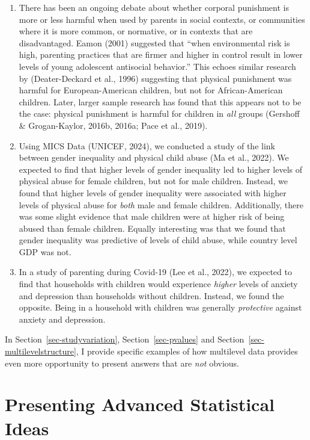 \documentclass[
  letterpaper,
  DIV=11,
  numbers=noendperiod]{scrreprt}
\providecommand{\tightlist}{%
  \setlength{\itemsep}{0pt}\setlength{\parskip}{0pt}}\usepackage{longtable,booktabs,array}
\begin{document}
\begin{enumerate}
\def\labelenumi{\arabic{enumi}.}
\tightlist
\item
  There has been an ongoing debate about whether corporal punishment is
  more or less harmful when used by parents in social contexts, or
  communities where it is more common, or normative, or in contexts that
  are disadvantaged. Eamon (2001) suggested that ``when environmental
  risk is high, parenting practices that are firmer and higher in
  control result in lower levels of young adolescent antisocial
  behavior.'' This echoes similar research by (Deater-Deckard et al.,
  1996) suggesting that physical punishment was harmful for
  European-American children, but not for African-American children.
  Later, larger sample research has found that this appears not to be
  the case: physical punishment is harmful for children in \emph{all}
  groups (Gershoff \& Grogan-Kaylor, 2016b, 2016a; Pace et al., 2019).
\item
  Using MICS Data (UNICEF, 2024), we conducted a study of the link
  between gender inequality and physical child abuse (Ma et al., 2022).
  We expected to find that higher levels of gender inequality led to
  higher levels of physical abuse for female children, but not for male
  children. Instead, we found that higher levels of gender inequality
  were associated with higher levels of physical abuse for \emph{both}
  male and female children. Additionally, there was some slight evidence
  that male children were at higher risk of being abused than female
  children. Equally interesting was that we found that gender inequality
  was predictive of levels of child abuse, while country level GDP was
  not.
\item
  In a study of parenting during Covid-19 (Lee et al., 2022), we
  expected to find that households with children would experience
  \emph{higher} levels of anxiety and depression than households without
  children. Instead, we found the opposite. Being in a household with
  children was generally \emph{protective} against anxiety and
  depression.
\end{enumerate}

In Section~\ref{sec-studyvariation}, Section~\ref{sec-pvalues} and
Section~\ref{sec-multilevelstructure}, I provide specific examples of
how multilevel data provides even more opportunity to present answers
that are \emph{not} obvious.

\section{Presenting Advanced Statistical
Ideas}\label{presenting-advanced-statistical-ideas}
\end{document}
